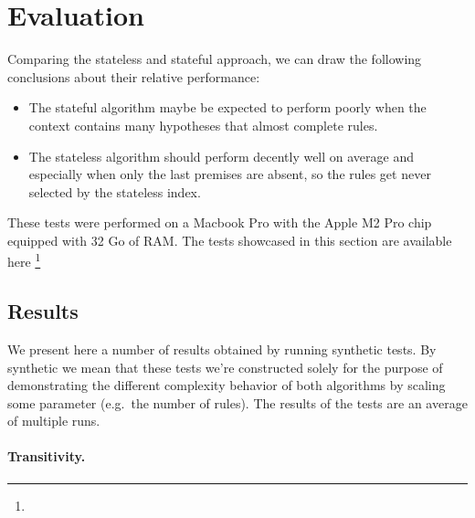 \documentclass[runningheads]{llncs}
\newcommand{\xcom}[1]{{\color{cyan}{Xavier: #1}} }
\begin{document}
\section{Evaluation}%
\label{sec:evaluation}

Comparing the stateless and stateful approach, we can draw the following conclusions about their relative performance:

\begin{itemize}
    \item The stateful algorithm maybe be expected to perform poorly when the context contains many hypotheses that almost complete rules.
    \item The stateless algorithm should perform decently well on average and especially when only the last premises are absent, so the rules get never selected by the stateless index.
\end{itemize}


These tests were performed on a Macbook Pro with the Apple M2 Pro chip equipped with 32 Go of RAM.
The tests showcased in this section are available here \footnote{\xcom{TODO : Link Github repo with tests.}}
\subsection{Results}
\xcom{TODO: Add a comment on the effect it had on Mathlib.}

We present here a number of results obtained by running synthetic tests.
By synthetic we mean that these tests we're constructed solely for the purpose of demonstrating the different complexity behavior of both algorithms by scaling some parameter (e.g.\ the number of rules).
The results of the tests are an average of multiple runs.

\paragraph{Transitivity.}
\end{document}
